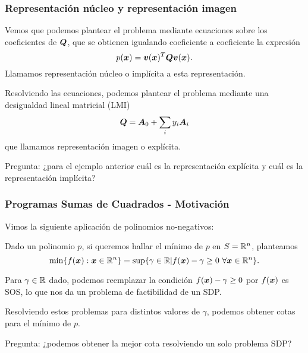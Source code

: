 \documentclass[aspectratio=169,12pt,spanish]{beamer}
\begin{document}
\begin{frame}

\frametitle{Representación núcleo y representación imagen}

Vemos que podemos plantear el problema mediante ecuaciones sobre los coeficientes de $\bm{Q}$, que se obtienen igualando coeficiente a coeficiente la expresión
$$p(\bm{x}) = \bm{v}(\bm{x})^T \bm{Q} \bm{v}(\bm{x}).$$
Llamamos representación núcleo o implícita a esta representación.

Resolviendo las ecuaciones, podemos plantear el problema mediante una desigualdad lineal matricial (LMI)
$$\bm{Q} = \bm{A}_0 + \sum_i y_i \bm{A}_i$$
que llamamos representación imagen o explícita.


Pregunta: ¿para el ejemplo anterior cuál es la representación explícita y cuál es la representación implícita?

\end{frame}


\begin{frame}

\frametitle{Programas Sumas de Cuadrados - Motivación}

Vimos la siguiente aplicación de polinomios no-negativos:

Dado un polinomio $p$, si queremos hallar el mínimo de $p$ en $S = \mathbb{R}^n$, planteamos
\[
\min\{f(\bm{x}) : \bm{x} \in \mathbb{R}^n\} = \sup\{\gamma \in \mathbb{R} | f(\bm{x}) - \gamma \ge 0 \ \forall \bm{x} \in \mathbb{R}^n\}.
\]

Para $\gamma \in \mathbb{R}$ dado, podemos reemplazar la condición $f(\bm{x}) - \gamma \ge 0$ por $f(\bm{x})$ es SOS, lo que nos da un problema de factibilidad de un SDP. 

Resolviendo estos problemas para distintos valores de $\gamma$, podemos obtener cotas para el mínimo de $p$.

Pregunta: ¿podemos obtener la mejor cota resolviendo un solo problema SDP?


\end{frame}

\end{document}
